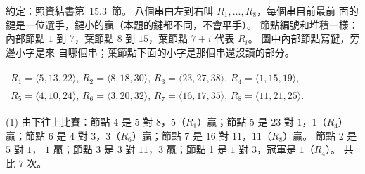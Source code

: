 \begin{pastsoln}
約定：照資結書第~15.3~節。 八個串由左到右叫 $R_1, \ldots, R_8$，每個串目前最前
面的鍵是一位選手，鍵小的贏（本題的鍵都不同，不會平手）。 節點編號和堆積一樣：內部節點
$1$ 到 $7$，葉節點 $8$ 到 $15$，葉節點 $7 + i$ 代表 $R_i$。 圖中內部節點寫鍵，旁邊小字是來
自哪個串；葉節點下面的小字是那個串還沒讀的部分。

\begin{center}
\begin{tabular}{l}
$R_1 = \langle 5, 13, 22 \rangle$, $R_2 = \langle 8, 18, 30 \rangle$, $R_3 = \langle 23, 27, 38 \rangle$, $R_4 = \langle 1, 15, 19 \rangle$, \\
$R_5 = \langle 4, 10, 24 \rangle$, $R_6 = \langle 3, 20, 32 \rangle$, $R_7 = \langle 16, 17, 35 \rangle$, $R_8 = \langle 11, 21, 25 \rangle$.
\end{tabular}
\end{center}

(1) 由下往上比賽：節點 4 是 $5$ 對 $8$，$5$（$R_1$）贏；節點 5 是 $23$ 對 $1$，$1$（$R_4$）贏；節點 6
是 $4$ 對 $3$，$3$（$R_6$）贏；節點 7 是 $16$ 對 $11$，$11$（$R_8$）贏。 節點 2 是 $5$ 對 $1$，
$1$ 贏；節點 3 是 $3$ 對 $11$，$3$ 贏；節點 1 是 $1$ 對 $3$，冠軍是 $1$（$R_4$）。 共比 $7$ 次。


\end{pastsoln}
